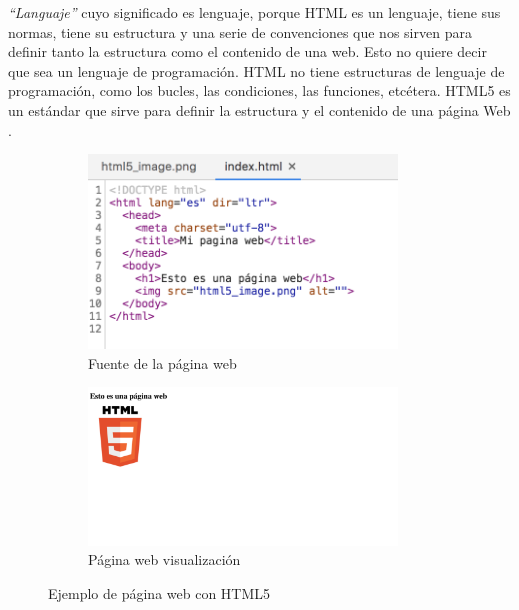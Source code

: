 \textit{``Languaje''} cuyo significado es lenguaje, porque HTML es un lenguaje, tiene sus normas, tiene su estructura y una serie de convenciones que nos sirven para definir tanto la estructura como el contenido de una web. Esto no quiere decir que sea un lenguaje de programación. HTML no tiene estructuras de lenguaje de programación, como los bucles, las condiciones, las funciones, etcétera. HTML5 es un estándar que sirve para definir la estructura y el contenido de una página Web \cite{html2}. 

\begin{figure}[H]
    \begin{subfigure}[b]{0.5\textwidth}
  \centering
    \includegraphics[width=0.9\textwidth, height=0.5\textwidth]{chapters/images/simplehtmlpage.png}
    \caption{Fuente de la página web}
    \label{fig:f2}
  \end{subfigure}
  \begin{subfigure}[b]{0.5\textwidth}
  \centering
    \includegraphics[width=0.9\textwidth, height=0.5\textwidth]{chapters/images/simplehtml.png}
    \caption{Página web visualización}
    \label{fig:f1}
  \end{subfigure}
  \hfill
  
  \caption{Ejemplo de página web con HTML5}
\end{figure}


